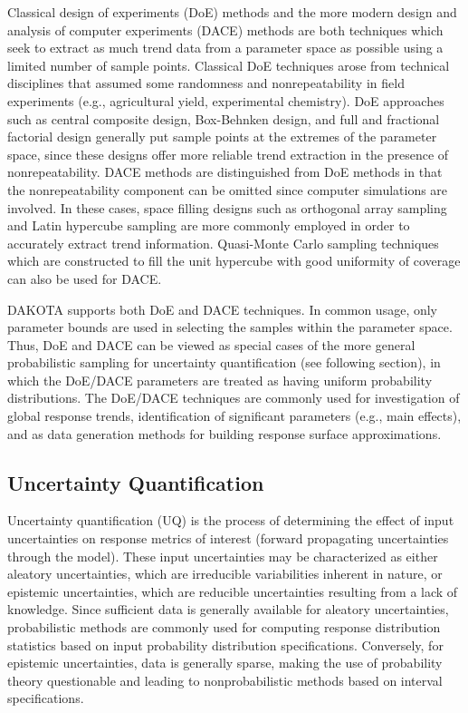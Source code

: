 Classical design of experiments (DoE) methods and the more modern
design and analysis of computer experiments (DACE) methods are both
techniques which seek to extract as much trend data from a parameter
space as possible using a limited number of sample points. Classical
DoE techniques arose from technical disciplines that assumed some
randomness and nonrepeatability in field experiments (e.g.,
agricultural yield, experimental chemistry). DoE approaches such as
central composite design, Box-Behnken design, and full and fractional
factorial design generally put sample points at the extremes of the
parameter space, since these designs offer more reliable trend
extraction in the presence of nonrepeatability. DACE methods are
distinguished from DoE methods in that the nonrepeatability component
can be omitted since computer simulations are involved. In these
cases, space filling designs such as orthogonal array sampling and
Latin hypercube sampling are more commonly employed in order to
accurately extract trend information. Quasi-Monte Carlo sampling 
techniques which are constructed to fill the unit hypercube with 
good uniformity of coverage can also be used for DACE.

DAKOTA supports both DoE and DACE techniques. In common usage, only
parameter bounds are used in selecting the samples within the
parameter space. Thus, DoE and DACE can be viewed as special cases of
the more general probabilistic sampling for uncertainty quantification
(see following section), in which the DoE/DACE parameters are treated
as having uniform probability distributions. The DoE/DACE techniques
are commonly used for investigation of global response trends,
identification of significant parameters (e.g., main effects), and as
data generation methods for building response surface approximations.

\subsection{Uncertainty Quantification}\label{introduction:background:uncertainty}

Uncertainty quantification (UQ) is the process of determining the
effect of input uncertainties on response metrics of interest (forward
propagating uncertainties through the model).  These input
uncertainties may be characterized as either aleatory uncertainties,
which are irreducible variabilities inherent in nature, or epistemic
uncertainties, which are reducible uncertainties resulting from a lack
of knowledge.  Since sufficient data is generally available for
aleatory uncertainties, probabilistic methods are commonly used for
computing response distribution statistics based on input probability
distribution specifications.  Conversely, for epistemic uncertainties,
data is generally sparse, making the use of probability theory
questionable and leading to nonprobabilistic methods based on interval
specifications.

